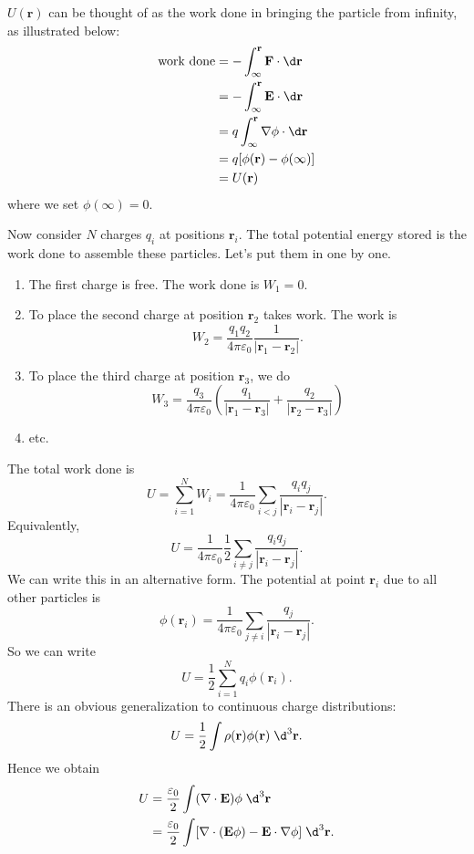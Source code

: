 \documentclass[a4paper]{article}
\begin{document}
$U(\mathbf{r})$ can be thought of as the work done in bringing the particle from infinity, as illustrated below:
\begin{align*}
  \text{work done} &= -\int_\infty^\mathbf{r} \mathbf{F}\cdot \d \mathbf{r}\\
  &= -\int_\infty^\mathbf{r}\mathbf{E}\cdot \d \mathbf{r} \\
  &= q\int_\infty^\mathbf{r} \nabla \mathbf{\phi}\cdot \d \mathbf{r}\\
  &= q[\phi(\mathbf{r}) - \phi(\infty)]\\
  &= U(\mathbf{r})
\end{align*}
where we set $\phi(\infty) = 0$.

Now consider $N$ charges $q_i$ at positions $\mathbf{r}_i$. The total potential energy stored is the work done to assemble these particles. Let's put them in one by one.
\begin{enumerate}
  \item The first charge is free. The work done is $W_1 = 0$.
  \item To place the second charge at position $\mathbf{r}_2$ takes work. The work is
    \[
      W_2 = \frac{q_1q_2}{4\pi\varepsilon_0}\frac{1}{|\mathbf{r}_1 - \mathbf{r}_2|}.
    \]
  \item To place the third charge at position $\mathbf{r}_3$, we do
    \[
      W_3 = \frac{q_3}{4\pi\varepsilon_0}\left(\frac{q_1}{|\mathbf{r}_1 - \mathbf{r}_3|} + \frac{q_2}{|\mathbf{r}_2 - \mathbf{r}_3|}\right)
    \]
  \item etc.
\end{enumerate}
The total work done is
\[
  U = \sum_{i = 1}^N W_i = \frac{1}{4\pi\varepsilon_0} \sum_{i < j} \frac{q_iq_j}{|\mathbf{r}_i - \mathbf{r}_j|}.
\]
Equivalently,
\[
  U = \frac{1}{4\pi\varepsilon_0} \frac{1}{2} \sum_{i \not= j} \frac{q_iq_j}{|\mathbf{r}_i - \mathbf{r}_j|}.
\]
We can write this in an alternative form. The potential at point $\mathbf{r}_i$ due to all other particles is
\[
  \phi(\mathbf{r}_i) = \frac{1}{4\pi\varepsilon_0}\sum_{j\not= i}\frac{q_j}{|\mathbf{r}_i - \mathbf{r}_j|}.
\]
So we can write
\[
  U = \frac{1}{2}\sum_{i = 1}^N q_i \phi(\mathbf{r}_i).
\]
There is an obvious generalization to continuous charge distributions:
\[
  U = \frac{1}{2} \int \rho (\mathbf{r}) \phi(\mathbf{r}) \;\d^3 \mathbf{r}.
\]
Hence we obtain
\begin{align*}
  U &= \frac{\varepsilon_0}{2}\int (\nabla\cdot \mathbf{E}) \phi \;\d^3 \mathbf{r}\\
  &= \frac{\varepsilon_0}{2}\int [\nabla\cdot (\mathbf{E}\phi) - \mathbf{E}\cdot \nabla \phi]\;\d^3 \mathbf{r}.
\end{align*}
\end{document}
